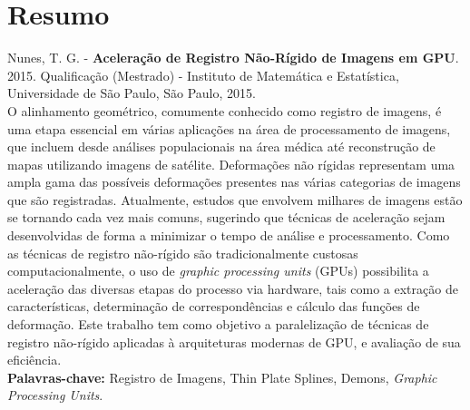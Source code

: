 \documentclass[11pt,twoside,a4paper]{book}
\begin{document}



\chapter*{Resumo}

\noindent Nunes, T. G. - \textbf{Aceleração de Registro Não-Rígido de Imagens em GPU}. 
2015.
Qualificação (Mestrado) - Instituto de Matemática e Estatística,
Universidade de São Paulo, São Paulo, 2015.
\\

O alinhamento geométrico, comumente conhecido como registro de imagens, é uma etapa essencial em várias 
aplicações na área de processamento de imagens, que incluem desde análises populacionais na área 
médica até reconstrução de mapas utilizando imagens de satélite. Deformações não rígidas representam 
uma ampla gama das possíveis deformações presentes nas várias categorias de imagens que são registradas. 
Atualmente, estudos que envolvem milhares de imagens estão se tornando cada vez mais comuns, sugerindo
que técnicas de aceleração sejam desenvolvidas de forma a minimizar o
tempo de análise e processamento. Como as técnicas de registro não-rígido são tradicionalmente custosas
computacionalmente, o uso de \textit{graphic processing units} (GPUs) possibilita a
aceleração das diversas etapas do processo via hardware, tais como a extração de características,
determinação de correspondências e cálculo das funções de deformação. Este trabalho
tem como objetivo a paralelização de técnicas de registro não-rígido aplicadas à arquiteturas modernas de 
GPU, e avaliação de sua eficiência. 
\\

\noindent \textbf{Palavras-chave:} Registro de Imagens, Thin Plate Splines, Demons, \textit{Graphic Processing Units}.

\end{document}
